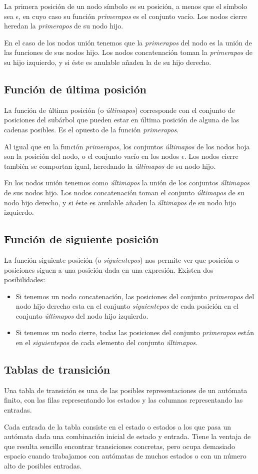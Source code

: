 La primera posición de un nodo símbolo es su posición, a menos que el símbolo sea $ \epsilon $, en cuyo caso su función \emph{primerapos} es el conjunto vacío.
Los nodos cierre heredan la \emph{primerapos} de su nodo hijo.

En el caso de los nodos unión tenemos que la \emph{primerapos} del nodo es la unión de las funciones de sus nodos hijo.
Los nodos concatenación toman la \emph{primerapos} de su hijo izquierdo, y si éste es anulable añaden la de su hijo derecho.

\subsection{Función de última posición}
La función de última posición (o \emph{últimapos}) corresponde con el conjunto de posiciones del subárbol que pueden estar en última posición de alguna de las cadenas posibles.
Es el opuesto de la función \emph{primerapos}.

Al igual que en la función \emph{primerapos}, los conjuntos \emph{últimapos} de los nodos hoja son la posición del nodo, o el conjunto vacío en los nodos $ \epsilon $.
Los nodos cierre también se comportan igual, heredando la \emph{últimapos} de su nodo hijo.

En los nodos unión tenemos como \emph{últimapos} la unión de los conjuntos \emph{últimapos} de sus nodos hijo.
Los nodos concatenación toman el conjunto \emph{últimapos} de su nodo hijo derecho, y si éste es anulable añaden la \emph{últimapos} de su nodo hijo izquierdo.

\subsection{Función de siguiente posición}
La función siguiente posición (o \emph{siguientepos}) nos permite ver que posición o posiciones siguen a una posición dada en una expresión.
Existen dos posibilidades:
\begin{itemize}
	\item Si tenemos un nodo concatenación, las posiciones del conjunto \emph{primerapos} del nodo hijo derecho esta en el conjunto \emph{siguientepos} de cada posición en el conjunto \emph{últimapos} del nodo hijo izquierdo.
	\item Si tenemos un nodo cierre, todas las posiciones del conjunto \emph{primerapos} están en el \emph{siguientepos} de cada elemento del conjunto \emph{últimapos}.
\end{itemize}

\subsection{Tablas de transición}
Una tabla de transición es una de las posibles representaciones de un autómata finito, con las filas representando los estados y las columnas representando las entradas.

Cada entrada de la tabla consiste en el estado o estados a los que pasa un autómata dada una combinación inicial de estado y entrada.
Tiene la ventaja de que resulta sencillo encontrar transiciones concretas, pero ocupa demasiado espacio cuando trabajamos con autómatas de muchos estados o con un número alto de posibles entradas.
